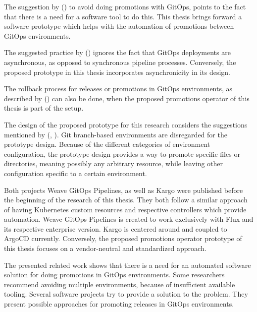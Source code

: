 
The suggestion by \citeauthor{gitopsCloudnativeCDInnoq} (\citeyear{gitopsCloudnativeCDInnoq})
to avoid doing promotions with GitOps,
points to the fact that there is a need for a software tool
to do this. This thesis brings forward a software prototype
which helps with the automation of promotions between GitOps environments.

The suggested practice by \citeauthor{gitopsAndKubernetes2021continuous} (\citeyear{gitopsAndKubernetes2021continuous})
ignores the fact that GitOps deployments are asynchronous,
as opposed to synchronous pipeline processes.
Conversely, the proposed prototype in this thesis incorporates asynchronicity
in its design.

The rollback process for releases or promotions in GitOps environments,
as described by
\citeauthor{gitopsAndKubernetes2021continuous} (\citeyear{gitopsAndKubernetes2021continuous})
can also be done, when the proposed promotions operator
of this thesis is part of the setup.

The design of the proposed prototype for this research
considers the suggestions mentioned by
\citeauthor{codefreshHowToModelGitOpsEnvironmentsAndPromote} (\citeyear{codefreshStopUsingBranchesGitOpsEnvironments}, \citeyear{codefreshHowToModelGitOpsEnvironmentsAndPromote}).
Git branch-based environments are disregarded for the prototype design.
Because of the different categories of environment configuration,
the prototype design provides a way to promote specific files or directories,
meaning possibly any arbitrary resource,
while leaving other configuration specific to a certain environment.

Both projects Weave GitOps Pipelines, as well as Kargo
were published before the beginning of the research of this thesis.
They both follow a similar approach of having Kubernetes custom resources and respective
controllers which provide automation.
Weave GitOps Pipelines is created to work exclusively with Flux and its respective enterprise version.
Kargo is centered around and coupled to ArgoCD currently.
Conversely, the proposed promotions operator prototype of this thesis
focuses on a vendor-neutral and standardized approach.












The presented related work shows that there is a need for an automated software solution
for doing promotions in GitOps environments.
Some researchers recommend avoiding multiple environments,
because of insufficient available tooling.
Several software projects try to provide a solution to the problem.
They present possible approaches for promoting releases in GitOps environments.

